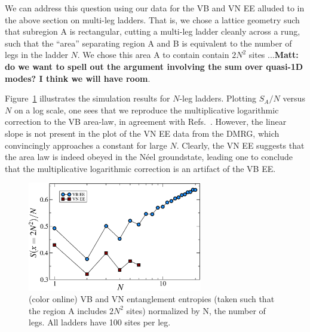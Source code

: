 \documentclass[prl,aps,twocolumn,floatfix,amsmath,amssymb,superscriptaddress,tightenlines]{revtex4}
\begin{document}
We can address this question using our data for the VB and VN EE alluded
to in the above section on multi-leg ladders.  That is, we chose a lattice
geometry such that subregion A is rectangular, cutting a multi-leg ladder
cleanly across a rung, such that the ``area'' separating region A and B is
equivalent to the number of legs in the ladder $N$.  We chose this area A
to contain contain $2N^2$ sites ...{\bf Matt: do we want to spell out the
argument involving the sum over quasi-1D modes?  I think we will have
room}.

Figure~\ref{zigzag} illustrates the simulation results for $N$-leg ladders.
Plotting $S_A/N$ versus $N$ on a log scale, one sees that we reproduce the
multiplicative logarithmic correction to the VB area-law, in agreement
with Refs.~\cite{Alet,Chh}.  However, the linear slope is not present in
the plot of the VN EE data from the DMRG, which convincingly approaches a
constant for large $N$.  Clearly, the VN EE suggests that the area law is
indeed obeyed in the N\'eel groundstate, leading one to conclude that the
multiplicative logarithmic correction is an artifact of the VB EE.


\begin{figure} { \includegraphics[width=3in]{fig4.eps} \caption{(color
online) VB and VN entanglement entropies (taken such that the region A
includes $2N^2$ sites) normalized by N, the number of legs.  All ladders
have 100 sites per leg.  \label{zigzag}}} \end{figure}
\end{document}
